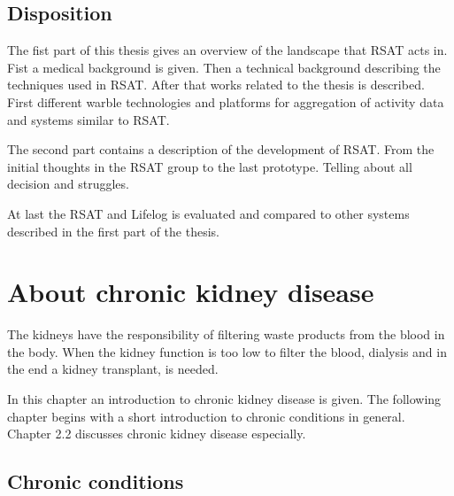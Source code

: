 \documentclass{cslthse-msc}
\begin{document}

\section{Disposition}

The fist part of this thesis gives an overview of the landscape that RSAT acts in. Fist a medical background is given. Then a technical background describing the techniques used in RSAT. After that works related to the thesis is described. First different warble technologies and platforms for aggregation of activity data and  systems similar to RSAT. 

The second part contains a description of the development of RSAT. From the initial thoughts in the RSAT group to the last prototype. Telling about all decision and struggles.  

At last the RSAT and Lifelog is evaluated and compared to other systems described in the first part of the thesis.





\chapter{About chronic kidney disease}

The kidneys have the responsibility of filtering waste products from the blood in the body\cite{NKDEPBASICS}. When the kidney function is too low to filter the blood, dialysis and in the end a kidney transplant, is needed.

In this chapter an introduction to chronic kidney disease is given. The following chapter begins with a short introduction to chronic conditions in general. Chapter 2.2 discusses chronic kidney disease especially.  

\section{Chronic conditions}
\end{document}
